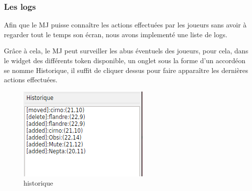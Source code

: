 \subsubsection{Les logs}

Afin que le MJ puisse connaître les actions effectuées par les joueurs sans avoir à regarder tout le temps son écran, nous avons implementé une  liste de logs.

Grâce à cela, le MJ peut surveiller les abus éventuels des joueurs, pour cela, dans le widget des différents token disponible, un onglet sous la forme d'un accordéon se nomme \og Historique\fg{}, il suffit de cliquer dessus pour faire apparaître les dernières actions effectuées.

\begin{figure}[h!]
    \centering
    \includegraphics[scale=0.7]{img/log.png}
    \caption{historique}
    \label{fig:log}
\end{figure}
